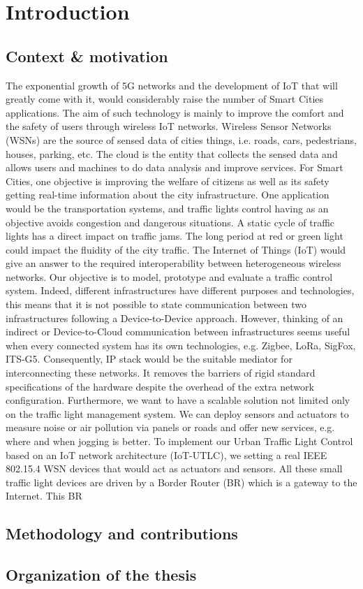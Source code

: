 \section{Introduction}

\subsection{Context \& motivation}

The exponential growth of 5G networks and the development of IoT that will greatly come with it,
	would considerably raise the number of Smart Cities applications.
The aim of such technology is mainly to improve the comfort and the safety of users through wireless IoT networks.
Wireless Sensor Networks (WSNs) are the source of sensed data of cities things,
	i.e.
roads,
	cars,
	pedestrians,
	houses,
	parking,
	etc.
The cloud is the entity that collects the sensed data and allows users and machines to do data analysis and improve services.
For Smart Cities,
	one objective is improving the welfare of citizens as well as its safety getting real-time information about the city infrastructure.
One application would be the transportation systems,
	and traffic lights control having as an objective avoids congestion and dangerous situations.
A static cycle of traffic lights has a direct impact on traffic jams.
The long period at red or green light could impact the fluidity of the city traffic.
The Internet of Things (IoT) would give an answer to the required interoperability between heterogeneous wireless networks.
Our objective is to model,
	prototype and evaluate a traffic control system.
Indeed,
	different infrastructures have different purposes and technologies,
	this means that it is not possible to state communication between two infrastructures following a Device-to-Device approach.
However,
	thinking of an indirect or Device-to-Cloud communication between infrastructures seems useful when every connected system has its own technologies,
	e.g.
Zigbee,
	LoRa,
	SigFox,
	ITS-G5.
Consequently,
	IP stack would be the suitable mediator for interconnecting these networks.
It removes the barriers of rigid standard specifications of the hardware despite the overhead of the extra network configuration.
Furthermore,
	we want to have a scalable solution not limited only on the traffic light management system.
We can deploy sensors and actuators to measure noise or air pollution via panels or roads and offer new services,
	e.g.
where and when jogging is better.
To implement our Urban Traffic Light Control based on an IoT network architecture (IoT-UTLC),
	we setting a real IEEE 802.15.4 WSN devices that would act as actuators and sensors.
All these small traffic light devices are driven by a Border Router (BR) which is a gateway to the Internet.
This BR 

\subsection{Methodology and contributions}

\subsection{Organization of the thesis}




